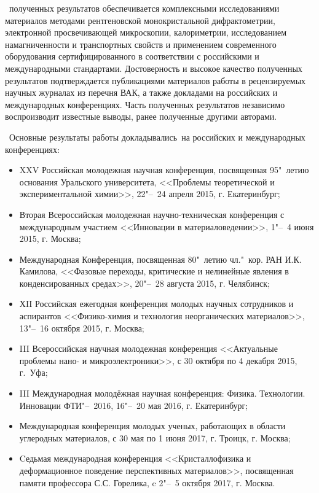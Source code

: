 \reliability\ полученных результатов обеспечивается комплексными
исследованиями материалов  методами рентгеновской монокристальной дифрактометрии, электронной просвечивающей микроскопии, калориметрии, исследованием намагниченности и транспортных свойств и применением современного оборудования
сертифицированного в соответствии с российскими и международными стандартами.
Достоверность и высокое качество полученных результатов
подтверждается публикациями материалов работы в рецензируемых научных журналах из перечня ВАК, а также докладами на российских и международных
конференциях.
Часть полученных результатов независимо воспроизводит известные выводы, ранее полученные другими авторами.

\probation\
Основные результаты работы докладывались~на российских и международных конференциях:
\begin{itemize}
\item  XXV Российская молодежная научная конференция, посвященная 95"~летию основания Уральского университета, <<Проблемы теоретической и экспериментальной химии>>, 22"--~24 апреля 2015, г. Екатеринбург;
\item Вторая Всероссийская молодежная научно-техническая конференция с международным участием <<Инновации в материаловедении>>, 1"--~4 июня 2015, г. Москва;
\item Международная Конференция, посвященная 80"~летию чл."~кор. РАН И.К. Камилова, <<Фазовые переходы, критические и нелинейные явления в конденсированных средах>>,  20"--~28 августа 2015, г. Челябинск;
\item ХII Российская ежегодная конференция молодых научных сотрудников и аспирантов <<Физико-химия и технология неорганических материалов>>, 13"--~16 октября 2015, г. Москва;
\item III Всероссийская научная молодежная конференция
<<Актуальные проблемы нано- и микроэлектроники>>, с 30 октября по 4 декабря 2015, г.~Уфа;
\item III Международная молодёжная научная конференция: Физика. Технологии. Инновации ФТИ"--~2016, 16"--~20 мая 2016, г. Екатеринбург;
\item Международная конференция молодых ученых, работающих в области углеродных материалов, с 30 мая по 1 июня 2017, г. Троицк, г. Москва;
\item Cедьмая международная конференция <<Кристаллофизика и деформационное поведение перспективных материалов>>, посвященная памяти профессора С.С. Горелика, c 2"--~5 октября 2017, г. Москва.
\end{itemize}


